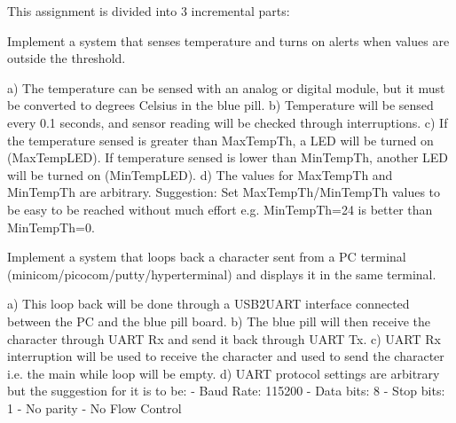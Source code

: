 This assignment is divided into 3 incremental parts\+:


\begin{DoxyEnumerate}
\item Implement a system that senses temperature and turns on alerts when values are outside the threshold. \begin{DoxyVerb} a) The temperature can be sensed with an analog or digital module, but it must be converted to degrees Celsius in the blue pill.
 b) Temperature will be sensed every 0.1 seconds, and sensor reading will be checked through interruptions.
 c) If the temperature sensed is greater than MaxTempTh, a LED will be turned on (MaxTempLED). If temperature sensed is lower than MinTempTh, another LED will be turned on (MinTempLED).
 d) The values for MaxTempTh and MinTempTh are arbitrary. Suggestion: Set MaxTempTh/MinTempTh values to be easy to be reached without much effort e.g. MinTempTh=24 is better than MinTempTh=0.
\end{DoxyVerb}

\item Implement a system that loops back a character sent from a PC terminal (minicom/picocom/putty/hyperterminal) and displays it in the same terminal. \begin{DoxyVerb} a) This loop back will be done through a USB2UART interface connected between the PC and the blue pill board.
 b) The blue pill will then receive the character through UART Rx and send it back through UART Tx.
 c) UART Rx interruption will be used to receive the character and used to send the character i.e. the main while loop will be empty.
 d) UART protocol settings are arbitrary but the suggestion for it is to be:
     - Baud Rate: 115200
     - Data bits: 8
     - Stop bits: 1
     - No parity
     - No Flow Control
\end{DoxyVerb}


\end{DoxyEnumerate}
